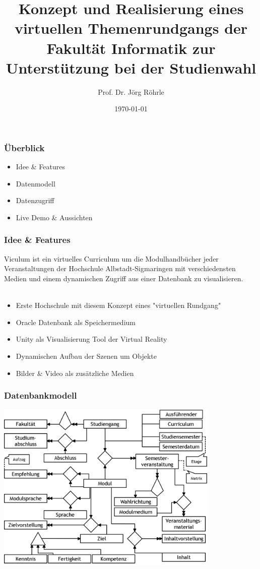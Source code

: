 \documentclass{beamer}
\title[Viculum]{Konzept und Realisierung eines virtuellen Themenrundgangs der Fakultät Informatik zur Unterstützung bei der Studienwahl} %
\author{Prof. Dr. Jörg Röhrle} %
\institute[HSALBSIG] %
{
Hochschule Albstadt-Sigmaringen \\ %
\medskip
\textit{Domenico Milazzo (TI), milazzdo@hs-albsig.de} %
\newline
\textit{Maik Dürr (TI), duerrmai@hs-albsig.de} %
\newline
\textit{Fabian Altenberg (WIN), altenbfa@hs-albsig.de} %
\newline
}
\date{\today} %
\begin{document}
\begin{frame}
\titlepage %
\end{frame}

\begin{frame}
\frametitle{Überblick}
\begin{itemize}
\item Idee \& Features
\item Datenmodell
\item Datenzugriff
\item Live Demo \& Aussichten
\end{itemize}
\end{frame}



\begin{frame}
\frametitle{Idee \& Features}
Viculum ist ein virtuelles Curriculum um die Modulhandbücher jeder Veranstaltungen der Hochschule Albstadt-Sigmaringen mit verschiedensten Medien und einem dynamischen Zugriff aus einer Datenbank zu visualisieren.\\~\\

\begin{itemize}
\item Erste Hochschule mit diesem Konzept eines "virtuellen Rundgang"
\item Oracle Datenbank als Speichermedium
\item Unity als Visualisierung Tool der Virtual Reality
\item Dynamischen Aufbau der Szenen um Objekte
\item Bilder \& Video als zusätzliche Medien
\end{itemize}
\end{frame}


\begin{frame}
\frametitle{Datenbankmodell}
\begin{center}
\includegraphics[width=0.8\textwidth]{pictures/Datenmodell_Viculum.png}
\end{center}
\end{frame}
\end{document}
